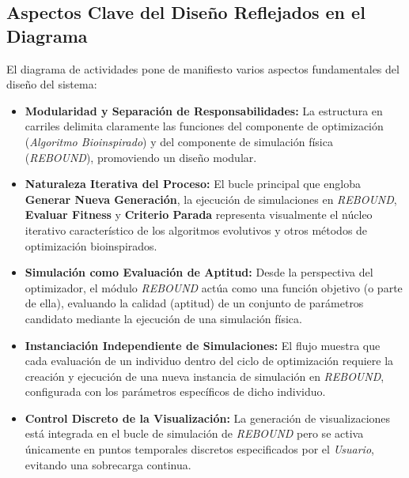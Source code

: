 \subsection{Aspectos Clave del Diseño Reflejados en el Diagrama}

El diagrama de actividades pone de manifiesto varios aspectos fundamentales del diseño del sistema:

\begin{itemize}
    \item \textbf{Modularidad y Separación de Responsabilidades:} La estructura en carriles delimita claramente las funciones del componente de optimización (\textit{Algoritmo Bioinspirado}) y del componente de simulación física (\textit{REBOUND}), promoviendo un diseño modular.
    \item \textbf{Naturaleza Iterativa del Proceso:} El bucle principal que engloba \textbf{Generar Nueva Generación}, la ejecución de simulaciones en \textit{REBOUND}, \textbf{Evaluar Fitness} y \textbf{Criterio Parada} representa visualmente el núcleo iterativo característico de los algoritmos evolutivos y otros métodos de optimización bioinspirados.
    \item \textbf{Simulación como Evaluación de Aptitud:} Desde la perspectiva del optimizador, el módulo \textit{REBOUND} actúa como una función objetivo (o parte de ella), evaluando la calidad (aptitud) de un conjunto de parámetros candidato mediante la ejecución de una simulación física.
    \item \textbf{Instanciación Independiente de Simulaciones:} El flujo muestra que cada evaluación de un individuo dentro del ciclo de optimización requiere la creación y ejecución de una nueva instancia de simulación en \textit{REBOUND}, configurada con los parámetros específicos de dicho individuo.
    \item \textbf{Control Discreto de la Visualización:} La generación de visualizaciones está integrada en el bucle de simulación de \textit{REBOUND} pero se activa únicamente en puntos temporales discretos especificados por el \textit{Usuario}, evitando una sobrecarga continua.
\end{itemize}
